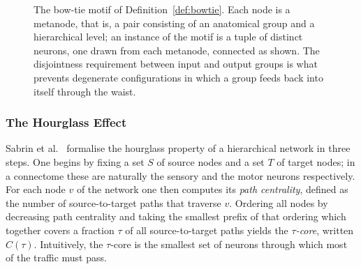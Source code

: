 \documentclass[12pt,a4paper,oneside]{article}
\theoremstyle{definition}
\theoremstyle{plain}
\newcommand{\kin}{k_{\mathrm{in}}}
\newcommand{\kout}{k_{\mathrm{out}}}
\begin{document}
\begin{figure}[H]
\centering
{}
\caption[The bow-tie motif]{The bow-tie motif of
Definition~\ref{def:bowtie}. Each node is a metanode, that is, a pair
consisting of an anatomical group and a hierarchical level; an instance of
the motif is a tuple of distinct neurons, one drawn from each metanode,
connected as shown. The disjointness requirement between input and output
groups is what prevents degenerate configurations in which a group feeds
back into itself through the waist.}
\label{fig:bowtie-schema}
\end{figure}

\subsubsection{The Hourglass Effect}

Sabrin et al.\ \cite{sabrin2020} formalise the hourglass property of a
hierarchical network in three steps. One begins by fixing a set $S$ of
source nodes and a set $T$ of target nodes; in a connectome these are
naturally the sensory and the motor neurons respectively. For each node $v$
of the network one then computes its \emph{path centrality}, defined as the
number of source-to-target paths that traverse $v$. Ordering all nodes by
decreasing path centrality and taking the smallest prefix of that ordering
which together covers a fraction $\tau$ of all source-to-target paths yields
the \emph{$\tau$-core}, written $C(\tau)$. Intuitively, the $\tau$-core is
the smallest set of neurons through which most of the traffic must pass.
\end{document}
